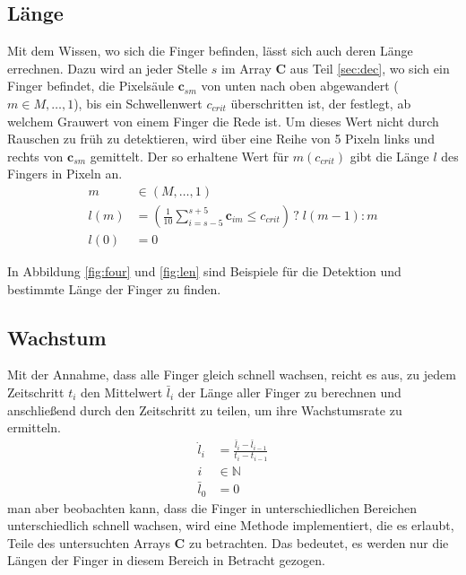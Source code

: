 \subsection{Länge}
\label{sec:lan}
Mit dem Wissen, wo sich die Finger befinden, lässt sich auch deren Länge errechnen. Dazu wird an jeder Stelle $s$ im Array $\mathbf{C}$ aus Teil \ref{sec:dec}, wo sich ein Finger befindet, die Pixelsäule $\mathbf{c}_{sm}$ von unten nach oben abgewandert ($m \in M, \dots, 1$), bis ein Schwellenwert $c_{crit}$ überschritten ist, der festlegt, ab welchem Grauwert von einem Finger die Rede ist. Um dieses Wert nicht durch Rauschen zu früh zu detektieren, wird über eine Reihe von 5 Pixeln links und rechts von $\mathbf{c}_{sm}$ gemittelt. Der so erhaltene Wert für $m(c_{crit})$ gibt die Länge $l$ des Fingers in Pixeln an.
\begin{align}
 m &\in (M,\dots,1) \\
 l(m) &= \left(\frac{1}{10}\sum_{i=s-5}^{s+5} \mathbf{c}_{im} \leq c_{crit} \right) \, ? \; l(m-1) : m \\
 l(0) &= 0
\end{align}

In Abbildung \ref{fig:four} und \ref{fig:len} sind Beispiele für die Detektion und bestimmte Länge der Finger zu finden.

\subsection{Wachstum}
\label{sec:grow}
Mit der Annahme, dass alle Finger gleich schnell wachsen, reicht es aus, zu jedem Zeitschritt $t_i$ den Mittelwert $\bar{l}_i$ der Länge aller Finger zu berechnen und anschließend durch den Zeitschritt zu teilen, um ihre Wachstumsrate zu ermitteln. 
\begin{align}
 \dot{l}_i &= \frac{\bar{l}_i-\bar{l}_{i-1}}{t_i-t_{i-1}} \\
 i &\in \mathbb{N} \\
 \bar{l}_{0} &= 0
\end{align}
 man aber beobachten kann, dass die Finger in unterschiedlichen Bereichen unterschiedlich schnell wachsen, wird eine Methode implementiert, die es erlaubt, Teile des untersuchten Arrays $\mathbf{C}$ zu betrachten. Das bedeutet, es werden nur die Längen der Finger in diesem Bereich in Betracht gezogen. 